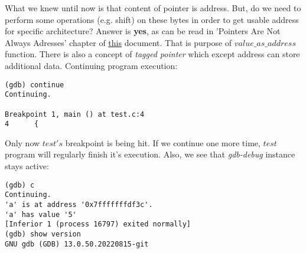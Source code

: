 \documentclass{report}
\begin{document}
What we knew until now is that content of pointer is address. But, do we need to perform some operations (e.g. shift) on these bytes in order to get usable address for specific architecture?
Answer is \textbf{yes}, as can be read in 'Pointers Are Not Always Adresses' chapter of \href{https://wwwcdf.pd.infn.it/localdoc/gdbint.pdf}{\underline{this}} document. That is purpose of $value\_as\_address$ function. There is also a concept of \textit{tagged pointer} which except address can store additional data. Continuing program execution:
\begin{verbatim}
(gdb) continue
Continuing.

Breakpoint 1, main () at test.c:4
4      {
\end{verbatim}
Only now $test's$ breakpoint is being hit. If we continue one more time, $test$ program will regularly finish it's execution. Also, we see that \textit{gdb-debug} instance stays active:
\begin{verbatim}
(gdb) c
Continuing.
'a' is at address '0x7fffffffdf3c'.
'a' has value '5'
[Inferior 1 (process 16797) exited normally]
(gdb) show version
GNU gdb (GDB) 13.0.50.20220815-git
\end{verbatim}
\end{document}
